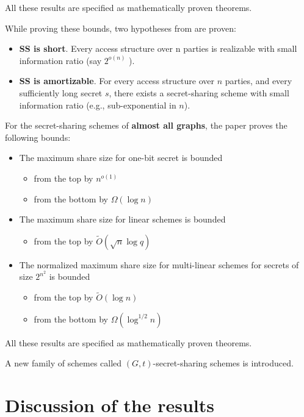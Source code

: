 All these results are specified as mathematically proven theorems.

While proving these bounds, two hypotheses from \cite{applebaumAmortization} are proven:

\begin{itemize}
    \item \textbf{SS is short}. Every access structure over n parties is realizable with small information ratio (say $2^{o(n)}$ ).
    \item \textbf{SS is amortizable}. For every access structure over $n$ parties, and every sufficiently long secret $s$, 
            there exists a secret-sharing scheme with small information ratio (e.g., sub-exponential in $n$).
\end{itemize}

For the secret-sharing schemes of \textbf{almost all graphs}, the paper proves the following bounds:

\begin{itemize}
    \item The maximum share size for one-bit secret is bounded 
    \begin{itemize}
        \item from the top by $n^{o(1)}$
        \item from the bottom by $\Omega(\log n)$
    \end{itemize}
    \item The maximum share size for linear schemes is bounded
    \begin{itemize}
        \item from the top by $\tilde{O}(\sqrt{n} \log q)$
    \end{itemize}
    \item The normalized maximum share size for multi-linear schemes for secrets of size $2^{n^2}$ is bounded
    \begin{itemize}
        \item from the top by $\tilde{O}(\log n)$
        \item from the bottom by $\Omega(\log^{1/2} n)$
    \end{itemize}
\end{itemize}

All these results are specified as mathematically proven theorems.

A new family of schemes called $(G, t)$-secret-sharing schemes is introduced.

\section{Discussion of the results}

